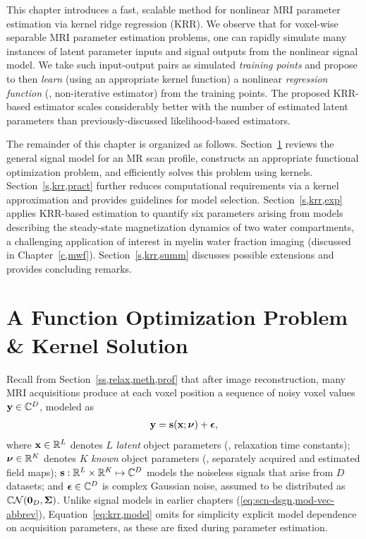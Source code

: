 This chapter introduces a fast, scalable method 
for nonlinear MRI parameter estimation
via kernel ridge regression (KRR).
We observe that 
for voxel-wise separable MRI parameter estimation problems,
one can rapidly simulate many instances
of latent parameter inputs and signal outputs
from the nonlinear signal model.
We take such input-output pairs
as simulated \emph{training points}
and propose to then \emph{learn}
(using an appropriate kernel function)
a nonlinear \emph{regression function}
(\ie, non-iterative estimator)
from the training points.
The proposed KRR-based estimator scales considerably better
with the number of estimated latent parameters
than previously-discussed likelihood-based estimators.

The remainder of this chapter
is organized as follows.
Section~\ref{s,krr,meth}
reviews the general signal model
for an MR scan profile,
constructs an appropriate functional optimization problem,
and efficiently solves this problem using kernels.
Section~\ref{s,krr,pract}
further reduces computational requirements 
via a kernel approximation
and provides guidelines 
for model selection.
Section~\ref{s,krr,exp}
applies KRR-based estimation
to quantify six parameters arising 
from models describing the steady-state 
magnetization dynamics
of two water compartments,
a challenging application
of interest in myelin water fraction imaging 
(discussed in Chapter~\ref{c,mwf}).
Section~\ref{s,krr,summ}
discusses possible extensions 
and provides concluding remarks.

\section{A Function Optimization Problem \& Kernel Solution}
\label{s,krr,meth}

Recall from Section~\ref{ss,relax,meth,prof}
that after image reconstruction,
many MRI acquisitions
produce at each voxel position
a sequence of noisy voxel values 
$\mathbf{y} \in \mathbb{C}^{D}$, 
modeled as
\begin{align}
	\bmy = \bms\paren{\bmx; \bmnu} + \bmeps,
	\label{eq:krr,model}
\end{align}
where $\mathbf{x} \in \mathbb{R}^{L}$ denotes $L$ \emph{latent} object parameters 
(\eg, relaxation time constants);
$\boldsymbol{\nu} \in \mathbb{R}^{K}$ denotes $K$ \emph{known} object parameters 
(\eg, separately acquired and estimated field maps);
$\mathbf{s} : \mathbb{R}^{L} \times \mathbb{R}^{K} \mapsto \mathbb{C}^{D}$ 
models the noiseless signals that arise from $D$ datasets;
and $\boldsymbol{\epsilon} \in \mathbb{C}^{D}$
is complex Gaussian noise,
assumed to be distributed as $\cgauss{\zeros{D}}{\bmSig}$.
Unlike signal models in earlier chapters
(\cf \eqref{eq:scn-dsgn,mod-vec-abbrev}),
Equation~\ref{eq:krr,model} omits
for simplicity
explicit model dependence on acquisition parameters,
as these are fixed 
during parameter estimation.

